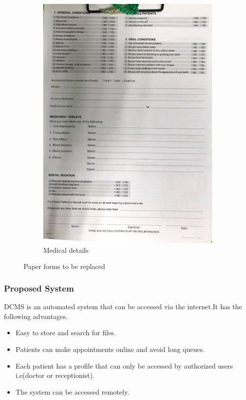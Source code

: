 \documentclass[11 pt]{article}
\begin{document}
\begin{figure}
\begin{subfigure}{.6\textwidth}
  \includegraphics[width=.95\linewidth]{patient_paper_form_med.jpeg}
  \caption{Medical details}
  \label{fig:sub2}
\end{subfigure}
\caption{Paper forms to be replaced}
\label{fig:test}
\end{figure}

\subsubsection{Proposed System}
DCMS is an automated system that can be accessed via the internet.It has the following advantages.
\begin{itemize}
\item
 Easy to store and search for files.
 \item
 Patients can make appointments online and avoid long queues.
 \item
 Each patient has a profile that can only be accessed by authorized users i.e(doctor or receptionist).
 \item
 The system can be accessed remotely.
\end{itemize}
\end{document}
